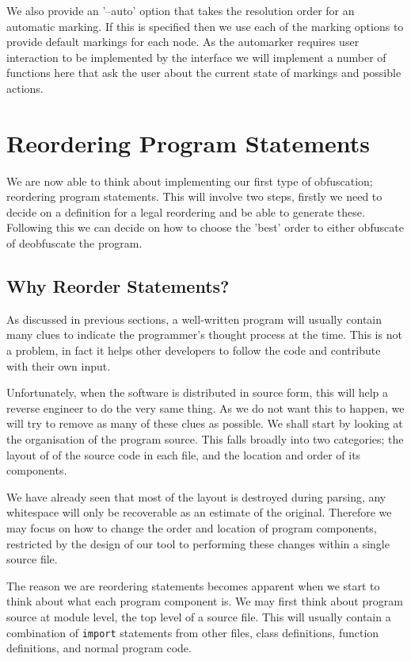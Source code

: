 \documentclass[twoside,a4paper]{report}
\begin{document}
We also provide an '--auto' option that takes the resolution order for an automatic marking. If this is specified then we use each of the
marking options to provide default markings for each node. As the automarker requires user interaction to be implemented by the interface
we will implement a number of functions here that ask the user about the current state of markings and possible actions.

\section{Reordering Program Statements}

We are now able to think about implementing our first type of obfuscation; reordering program statements. This will involve two steps,
firstly we need to decide on a definition for a legal reordering and be able to generate these. Following this we can decide on how to
choose the 'best' order to either obfuscate of deobfuscate the program.

\subsection{Why Reorder Statements?}

As discussed in previous sections, a well-written program will usually contain many clues to indicate the programmer's thought process
at the time. This is not a problem, in fact it helps other developers to follow the code and contribute with their own input. 

Unfortunately, when the software is distributed in source form, this will help a reverse engineer to do the very same thing. As we do not want
this to happen, we will try to remove as many of these clues as possible. We shall start by looking at the organisation of the program source.
This falls broadly into two categories; the layout of of the source code in each file, and the location and order of its components. 

We have already seen that most of the layout is destroyed during parsing, any whitespace will only be recoverable as an estimate of the original.
Therefore we may focus on how to change the order and location of program components, restricted by the design of our tool to performing these
changes within a single source file.

The reason we are reordering statements becomes apparent when we start to think about what each program component is. We may first think about
program source at module level, the top level of a source file. This will usually contain a combination of \texttt{import} statements from
other files, class definitions, function definitions, and normal program code.
\end{document}
